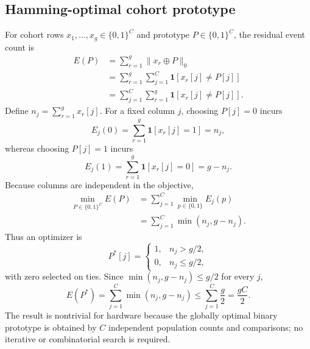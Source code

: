 \documentclass[10pt,conference]{IEEEtran}
\newcommand{\xor}{\mathbin{\oplus}}
\begin{document}
\subsection{Hamming-optimal cohort prototype}
For cohort rows $x_1,\ldots,x_g\in\{0,1\}^C$ and prototype $P\in\{0,1\}^C$, the residual event count is
\begin{align}
E(P)
&=\sum_{r=1}^{g}\lVert x_r\xor P\rVert_0 \\
&=\sum_{r=1}^{g}\sum_{j=1}^{C}\mathbf{1}[x_r[j]\ne P[j]] \\
&=\sum_{j=1}^{C}\sum_{r=1}^{g}\mathbf{1}[x_r[j]\ne P[j]].
\end{align}
Define $n_j=\sum_{r=1}^{g}x_r[j]$. For a fixed column $j$, choosing $P[j]=0$ incurs
\begin{equation}
E_j(0)=\sum_{r=1}^{g}\mathbf{1}[x_r[j]=1]=n_j,
\end{equation}
whereas choosing $P[j]=1$ incurs
\begin{equation}
E_j(1)=\sum_{r=1}^{g}\mathbf{1}[x_r[j]=0]=g-n_j.
\end{equation}
Because columns are independent in the objective,
\begin{align}
\min_{P\in\{0,1\}^C}E(P)
&=\sum_{j=1}^{C}\min_{p\in\{0,1\}}E_j(p) \\
&=\sum_{j=1}^{C}\min(n_j,g-n_j).
\end{align}
Thus an optimizer is
\begin{equation}
P^*[j]=\begin{cases}
1,&n_j>g/2,\\
0,&n_j\le g/2,
\end{cases}
\end{equation}
with zero selected on ties. Since $\min(n_j,g-n_j)\le g/2$ for every $j$,
\begin{equation}
E(P^*)=\sum_{j=1}^{C}\min(n_j,g-n_j)\le\sum_{j=1}^{C}\frac{g}{2}=\frac{gC}{2}.
\end{equation}
The result is nontrivial for hardware because the globally optimal binary prototype is obtained by $C$ independent population counts and comparisons; no iterative or combinatorial search is required.
\end{document}
